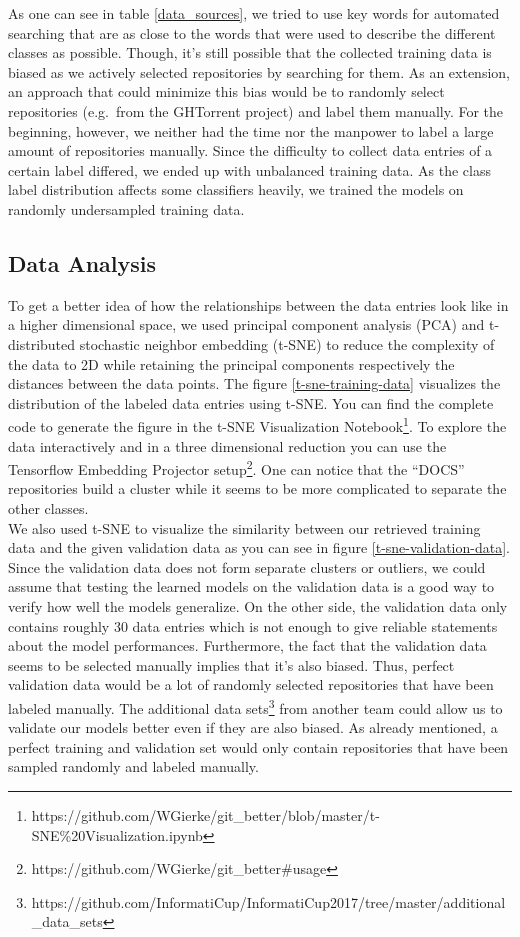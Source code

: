 \documentclass[%
a4paper,
DIV12,
2.5headlines,
bigheadings,
titlepage,
openbib,
]{scrartcl}
\begin{document}
As one can see in table \ref{data_sources}, we tried to use key words for automated searching that are as close to the words that were used to describe the different classes as possible.
Though, it's still possible that the collected training data is biased as we actively selected repositories by searching for them.
As an extension, an approach that could minimize this bias would be to randomly select repositories (e.g.~from the GHTorrent project) and label them manually.
For the beginning, however, we neither had the time nor the manpower to label a large amount of repositories manually.
Since the difficulty to collect data entries of a certain label differed, we ended up with unbalanced training data.
As the class label distribution affects some classifiers heavily, we trained the models on randomly undersampled training data.

\subsection{Data Analysis}\label{data-analysis}

To get a better idea of how the relationships between the data entries look like in a higher dimensional space, we used principal component
analysis (PCA) and t-distributed stochastic neighbor embedding (t-SNE) to reduce the complexity of the data to 2D while retaining the principal
components respectively the distances between the data points.
The figure \ref{t-sne-training-data} visualizes the distribution of the labeled data entries using t-SNE.
You can find the complete code to generate the figure in the t-SNE Visualization Notebook\footnote{https://github.com/WGierke/git\_better/blob/master/t-SNE\%20Visualization.ipynb}.
To explore the data interactively and in a three dimensional reduction you can use the Tensorflow Embedding Projector setup\footnote{https://github.com/WGierke/git\_better\#usage}.
One can notice that the ``DOCS'' repositories build a cluster while it seems to be more complicated to separate the other classes.\\
We also used t-SNE to visualize the similarity between our retrieved training data and the given validation data as you can see in figure \ref{t-sne-validation-data}.
Since the validation data does not form separate clusters or outliers, we could assume that testing the learned models on the validation data
is a good way to verify how well the models generalize.
On the other side, the validation data only contains roughly 30 data entries which is not enough to give reliable statements about the model performances.
Furthermore, the fact that the validation data seems to be selected manually implies that it's also biased.
Thus, perfect validation data would be a lot of randomly selected repositories that have been labeled manually.
The additional data sets\footnote{https://github.com/InformatiCup/InformatiCup2017/tree/master/additional\_data\_sets} from another team could allow us to validate our models better even if they are also biased.
As already mentioned, a perfect training and validation set would only contain repositories that have been sampled randomly and labeled manually.
\end{document}
